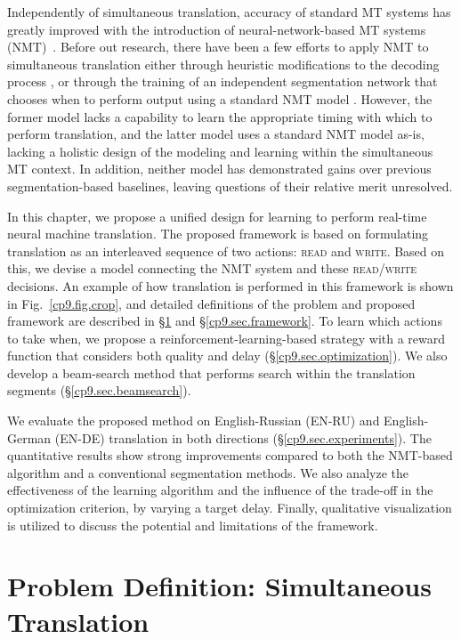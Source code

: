 Independently of simultaneous translation, accuracy of standard MT systems has greatly improved with the introduction of neural-network-based MT systems (NMT)~\cite{sutskever2014sequence,bahdanau2014neural,vaswani2017attention}. Before out research, there have been a few efforts to apply NMT to simultaneous translation either through heuristic modifications to the decoding process \cite{cho2016can}, or through the training of an independent segmentation network that chooses when to perform output using a standard NMT model \cite{satija2016simultaneous}.
However, the former model lacks a capability to learn the appropriate timing with which to perform translation, and the latter model uses a standard NMT model as-is, lacking a holistic design of the modeling and learning within the simultaneous MT context.
In addition, neither model has demonstrated gains over previous segmentation-based baselines, leaving questions of their relative merit unresolved.

  
In this chapter, we propose a unified design for learning to perform real-time neural machine translation.
The proposed framework is based on formulating translation as an interleaved sequence of two actions: \textsc{read} and \textsc{write}.
Based on this, we devise a model connecting the NMT system and these \textsc{read}/\textsc{write} decisions.
An example of how translation is performed in this framework is shown in Fig.~\ref{cp9.fig.crop}, and detailed definitions of the problem and proposed framework are described in \S\ref{cp9.sec.definition} and \S\ref{cp9.sec.framework}.
To learn which actions to take when, we propose a reinforcement-learning-based strategy with a reward function that considers both quality and delay (\S\ref{cp9.sec.optimization}).
We also develop a beam-search method that performs search within the translation segments (\S\ref{cp9.sec.beamsearch}).

We evaluate the proposed method on English-Russian (EN-RU) and English-German (EN-DE) translation in both directions (\S\ref{cp9.sec.experiments}).
The quantitative results show strong improvements compared to both the NMT-based algorithm and a conventional segmentation methods.
We also analyze the effectiveness of the learning algorithm and the influence of the trade-off in the optimization criterion, by varying a target delay.
Finally, qualitative visualization is utilized to discuss the potential and limitations of the framework.


\section{Problem Definition: Simultaneous Translation}
\label{cp9.sec.definition}

